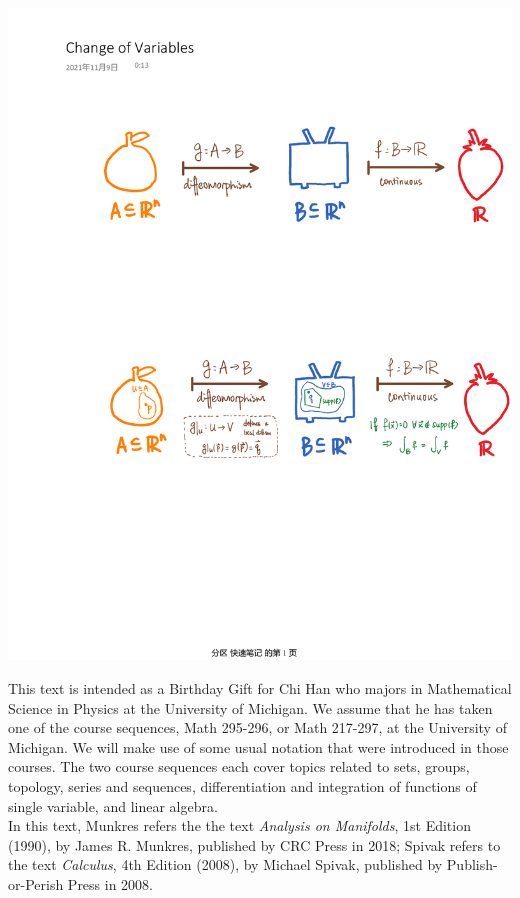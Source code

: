 \documentclass[15pt]{book}
\theoremstyle{break}
\theoremstyle{break}
\begin{document}
\newpage
\vspace*{1.5cm}
\begin{center}
\includegraphics[scale=0.8]{cor13.4.pdf}\\
\end{center}
\vspace*{\fill}
This text is intended as a Birthday Gift for Chi Han who majors in Mathematical Science in Physics at the University of Michigan. We assume that he has taken one of the course sequences, Math 295-296, or Math 217-297, at the University of Michigan. We will make use of some usual notation that were introduced in those courses. The two course sequences each cover topics related to sets, groups, topology, series and sequences, differentiation and integration of functions of single variable, and linear algebra.\\

In this text, Munkres refers the the text \textit{Analysis on Manifolds}, 1st Edition (1990), by James R. Munkres, published by CRC Press in 2018; Spivak refers to the text \textit{Calculus}, 4th Edition (2008), by Michael Spivak, published by Publish-or-Perish Press in 2008.\\
\end{document}
